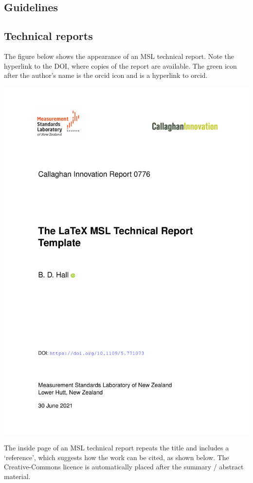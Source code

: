 {\subsection{Guidelines}
\subsection{Technical reports}
The figure below shows the appearance of an MSL technical report. Note the hyperlink to the DOI, where copies of the report are available. The green icon after the author's name is the orcid icon and is a hyperlink to orcid.

\begin{center}
\includegraphics[scale=.5,page=1]{pictures/Report}
\end{center}

\newpage
The inside page of an MSL technical report repeats the title and includes a `reference', which suggests how the work can be cited, as shown below. The Creative-Commons licence is automatically placed after the summary / abstract material. 

}
